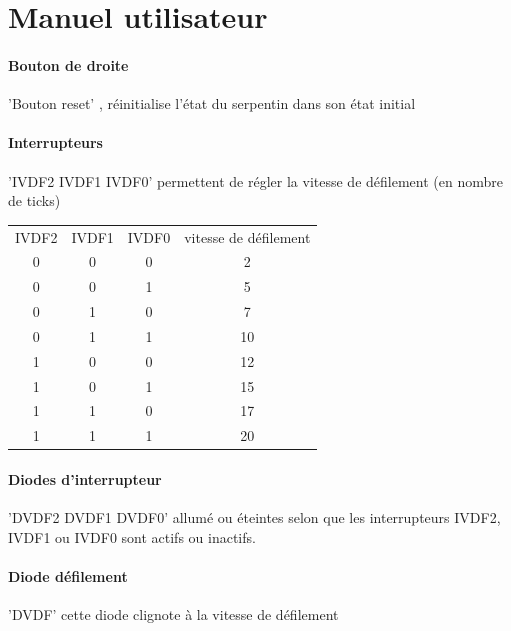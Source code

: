 \documentclass[10pt]{article}
\begin{document}
    \newpage
    \section{Manuel utilisateur}
    
    \paragraph{Bouton de droite} 'Bouton reset' , réinitialise l'état du serpentin dans son état initial
    
    \paragraph{Interrupteurs} 'IVDF2 IVDF1 IVDF0' permettent de régler la vitesse de défilement (en nombre de ticks)
    
    \begin{table}[h]
        \centering
        \begin{tabular}{cccc}
                IVDF2 & IVDF1 & IVDF0 & vitesse de défilement \\
                  0   &   0   &   0   & 2 \\
                  0   &   0   &   1   & 5 \\
                  0   &   1   &   0   & 7 \\
                  0   &   1   &   1   & 10 \\
                  1   &   0   &   0   & 12 \\
                  1   &   0   &   1   & 15 \\
                  1   &   1   &   0   & 17 \\
                  1   &   1   &   1   & 20 \\
        \end{tabular}
    \end{table}
        
    \paragraph{Diodes d'interrupteur} 'DVDF2 DVDF1 DVDF0' allumé ou éteintes selon que les interrupteurs IVDF2, IVDF1 ou IVDF0 sont actifs ou inactifs.
    
    \paragraph{Diode défilement} 'DVDF' cette diode clignote à la vitesse de défilement
    
\end{document}
